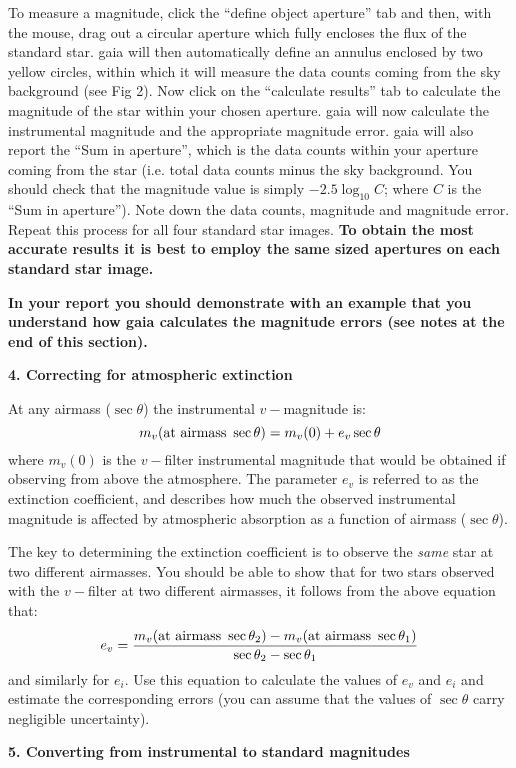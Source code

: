 To measure a magnitude, click the ``define object aperture'' tab and
then, with the mouse, drag out a circular aperture which fully
encloses the flux of the standard star. {\sc gaia} will then automatically define
an annulus enclosed by two yellow circles, within which it will
measure the data counts coming from the sky background (see Fig 2). Now click on the
``calculate results'' tab to calculate the magnitude of the star within your chosen aperture. 
{\sc gaia} will now calculate the instrumental magnitude and the
appropriate magnitude error. {\sc gaia} will also report the ``Sum in
aperture'', which is the data counts within your aperture coming from
the star (i.e. total data counts minus the sky background. You should
check that the magnitude value is simply $-2.5\log_{10} C$; where
$C$ is the ``Sum in aperture''). Note down the data counts, magnitude
and magnitude error. Repeat this process for all four standard star images.
{\bf To obtain the most accurate results it is best to employ the same
sized apertures on each standard star image.}


\newpage
{\bf In your report you should demonstrate with an example that you
understand how {\sc gaia} calculates the magnitude errors (see notes
at the end of this section).}



{\large{\bf 4. Correcting for atmospheric extinction}}

At any airmass ($\sec \theta$) the instrumental $v-$magnitude is:
\[   m_v({\rm at\ airmass\ }\sec \theta) = m_v(0) + e_v\sec \theta   \]
where $m_v(0)$ is the $v-$filter instrumental magnitude that would be obtained if 
observing from above the atmosphere. The parameter $e_v$ is referred
to as the extinction coefficient, and describes how much the observed
instrumental magnitude is affected by atmospheric absorption as a
function of airmass ($\sec \theta$).

The key to determining the extinction coefficient is to observe the
{\it same} star at two different airmasses. You should be able to show
that for two stars observed with the $v-$filter at two different
airmasses, it follows from the above equation that:
\[   e_v = \frac{m_v({\rm at\ airmass\ }\sec \theta_2)-m_v({\rm at\
airmass\ }\sec \theta_1)}{\sec \theta_2 - \sec \theta_1}   \]
and similarly for $e_i$. Use this equation to calculate the values of $e_v$ and $e_i$ and
estimate the corresponding errors (you can assume that the values of
$\sec \theta$ carry negligible uncertainty).

{\large{\bf 5. Converting from instrumental to standard magnitudes}}

